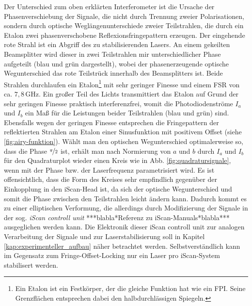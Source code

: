 Der Unterschied zum oben erklärten Interferometer ist die Ursache der
Phasenverschiebung der Signale, die nicht durch Trennung zweier Polarisationen,
sondern durch optische Weglängenunterschiede zweier Teilstrahlen, die durch ein
Etalon zwei phasenverschobene Reflexionsfringepattern erzeugen. Der eingehende
rote Strahl ist ein Abgriff des zu stabilisierenden Lasers. An einem gekeilten
Beamsplitter wird dieser in zwei Teilstrahlen mir unterschiedlicher Phase
aufgeteilt (blau und grün dargestellt), wobei der phasenerzeugende optische
Wegunterschied das rote Teilstrück innerhalb des Beamsplitters ist. Beide
Strahlen durchlaufen ein Etalon\footnote{Ein Etalon ist ein Festkörper, der die gleiche Funktion hat wie ein FPI. Seine Grenzflächen entsprechen dabei den halbdurchlässigen Spiegeln.} mit sehr geringer Finesse und einem FSR von ca. $7,8\,$GHz. Ein großer Teil des Lichts transmittiert das Etalon auf Grund der sehr geringen Finesse praktisch
interferenzfrei, womit die Photodiodenströme $I_a$ und $I_b$ ein Maß für die Leistungen beider Teilstrahlen
(blau und grün) sind. Ebensfalls wegen der geringen Finesse entsprechen die
Fringepattern der reflektierten Strahlen am Etalon einer Sinusfunktion mit positivem Offset
(siehe \ref{fig:airy-funktion}). Wählt man den optischen Wegunterschied
optimalerweise so, dass die Phase $\nicefrac{\pi}{2}$ ist, erhält
man nach Normierung von $a$ und $b$ durch $I_a$ und $I_b$ für den Quadraturplot
wieder einen Kreis wie in Abb. \ref{fig:quadratursignale}, wenn mit der Phase bzw. der Laserfrequenz parametrisiert wird. Es ist offensichtlich, dass die Form des Kreises sehr
empfindlich gegenüber der Einkopplung in den iScan-Head ist, da sich der
optische Wegunterschied und somit die Phase zwischen den Teilstrahlen leicht
ändern kann. Dadurch kommt es zu einer elliptischen Verformung, die allerdings durch
Modifizierung der Signale in der sog. \textit{iScan controll unit}
***blabla*Referenz zu iScan-Manuals*blabla***
ausgeglichen werden kann. Die Elektronik dieser iScan controll unit zur analogen
Verarbeitung der Signale und zur Laserstabilisierung soll in Kapitel
\ref{kap:experimenteller_aufbau} näher betrachtet werden. Selbstverständlich
kann im Gegensatz zum Fringe-Offset-Locking nur ein Laser pro iScan-System
stabilisert werden.

